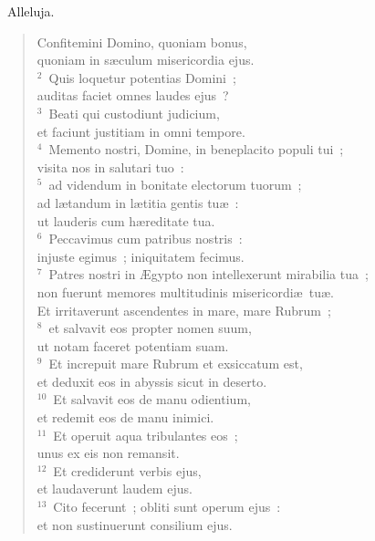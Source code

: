 ~\lettrine[lines=10,image=true,loversize=0.05,lraise=-0.03]{A}{}lleluja. \begin{flushleft}\begin{verse}\vspace{6pt}Confitemini Domino, quoniam bonus,\\ quoniam in s\ae culum misericordia ejus.\\
${}^{2}$~Quis loquetur potentias Domini~;\\ auditas faciet omnes laudes ejus~?\\
${}^{3}$~Beati qui custodiunt judicium,\\ et faciunt justitiam in omni tempore.\\
${}^{4}$~Memento nostri, Domine, in beneplacito populi tui~;\\ visita nos in salutari tuo~:\\
${}^{5}$~ad videndum in bonitate electorum tuorum~;\\ ad l\ae tandum in l\ae titia gentis tu\ae~:\\ ut lauderis cum h\ae reditate tua.\\
${}^{6}$~Peccavimus cum patribus nostris~:\\ injuste egimus~; iniquitatem fecimus.\\
${}^{7}$~Patres nostri in \AE gypto non intellexerunt mirabilia tua~;\\ non fuerunt memores multitudinis misericordi\ae\ tu\ae .\\ Et irritaverunt ascendentes in mare, mare Rubrum~;\\
${}^{8}$~et salvavit eos propter nomen suum,\\ ut notam faceret potentiam suam.\\
${}^{9}$~Et increpuit mare Rubrum et exsiccatum est,\\ et deduxit eos in abyssis sicut in deserto.\\
${}^{10}$~Et salvavit eos de manu odientium,\\ et redemit eos de manu inimici.\\
${}^{11}$~Et operuit aqua tribulantes eos~;\\ unus ex eis non remansit.\\
${}^{12}$~Et crediderunt verbis ejus,\\ et laudaverunt laudem ejus.\\
${}^{13}$~Cito fecerunt~; obliti sunt operum ejus~:\\ et non sustinuerunt consilium ejus.\\

\end{verse}
\end{flushleft}
